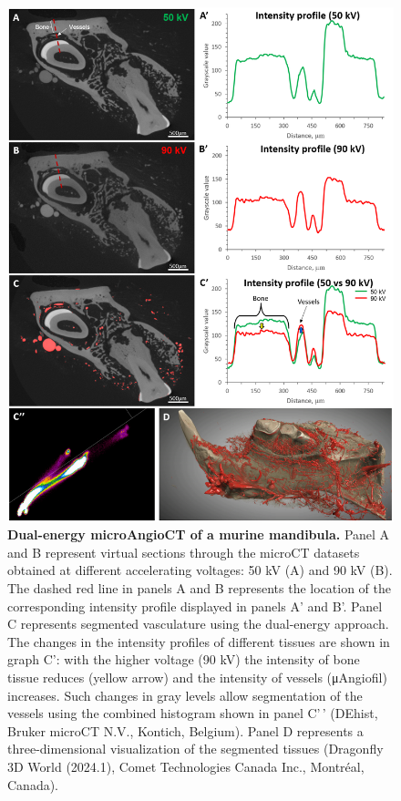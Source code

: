 \begin{figure}
\hypertarget{fig:7}{%
\centering
\includegraphics{images/Fig7_DualEnergy.png}
\caption{\textbf{Dual-energy microAngioCT of a murine mandibula.}
Panel A and B represent virtual sections through the microCT datasets obtained at different accelerating voltages: 50 kV (A) and 90 kV (B).
The dashed red line in panels A and B represents the location of the corresponding intensity profile displayed in panels A' and B'.
Panel C represents segmented vasculature using the dual-energy approach.
The changes in the intensity profiles of different tissues are shown in graph C': with the higher voltage (90 kV) the intensity of bone tissue reduces (yellow arrow) and the intensity of vessels (μAngiofil) increases.
Such changes in gray levels allow segmentation of the vessels using the combined histogram shown in panel C'\,' (DEhist, Bruker microCT N.V., Kontich, Belgium).
Panel D represents a three-dimensional visualization of the segmented tissues (Dragonfly 3D World (2024.1), Comet Technologies Canada Inc., Montréal, Canada).}\label{fig:7}
}
\end{figure}

